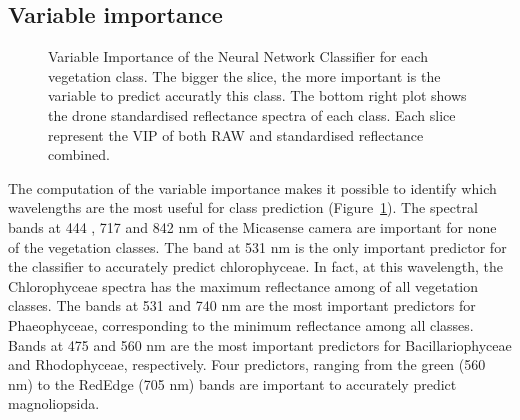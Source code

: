 \documentclass[
  number]{elsarticle}
\begin{document}
\subsection{Variable importance}\label{variable-importance}

\label{cell-fig-VIP}
\begin{figure}[H]


\caption{\label{fig-VIP}Variable Importance of the Neural Network
Classifier for each vegetation class. The bigger the slice, the more
important is the variable to predict accuratly this class. The bottom
right plot shows the drone standardised reflectance spectra of each
class. Each slice represent the VIP of both RAW and standardised
reflectance combined.}

\end{figure}%

The computation of the variable importance makes it possible to identify
which wavelengths are the most useful for class prediction
(Figure~\ref{fig-VIP}). The spectral bands at 444 , 717 and 842 nm of
the Micasense camera are important for none of the vegetation classes.
The band at 531 nm is the only important predictor for the classifier to
accurately predict chlorophyceae. In fact, at this wavelength, the
Chlorophyceae spectra has the maximum reflectance among of all
vegetation classes. The bands at 531 and 740 nm are the most important
predictors for Phaeophyceae, corresponding to the minimum reflectance
among all classes. Bands at 475 and 560 nm are the most important
predictors for Bacillariophyceae and Rhodophyceae, respectively. Four
predictors, ranging from the green (560 nm) to the RedEdge (705 nm)
bands are important to accurately predict magnoliopsida.
\end{document}
